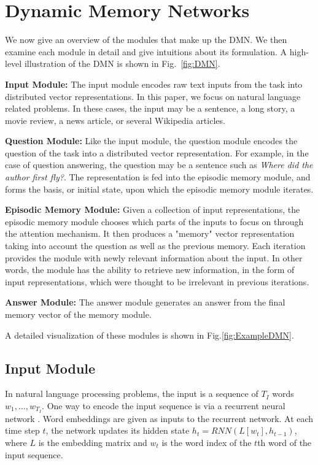 \documentclass{article}
\begin{document}
\section{Dynamic Memory Networks}
We now give an overview of the modules that make up the DMN. We then examine each module in detail and give intuitions about its formulation. A high-level illustration of the DMN is shown in Fig.~\ref{fig:DMN}.

\textbf{Input Module:}
The input module encodes raw text inputs from the task into distributed vector representations. In this paper, we focus on natural language related problems. In these cases, the input may be a sentence, a long story, a movie review, a news article, or several Wikipedia articles.

\textbf{Question Module:}
Like the input module, the question module encodes the question of the task into a distributed vector representation. For example, in the case of question answering, the question may be a sentence such as \emph{Where did the author first fly?}. The representation is fed into the episodic memory module, and forms the basis, or initial state, upon which the episodic memory module iterates.

\textbf{Episodic Memory Module:}
Given a collection of input representations, the episodic memory module chooses which parts of the inputs to focus on through the attention mechanism. It then produces a "memory" vector representation taking into account the question as well as the previous memory. Each iteration provides the module with newly relevant information about the input. In other words, the module has the ability to retrieve new information, in the form of input representations, which were thought to be irrelevant in previous iterations.

\textbf{Answer Module:} The answer module generates an answer from the final memory vector of the memory module.

A detailed visualization of these modules is shown in Fig.\ref{fig:ExampleDMN}.

\subsection{Input Module}\label{section:input}
In natural language processing problems, the input is a sequence of $T_I$ words $w_1,\ldots,w_{T_I}$. One way to encode the input sequence is via a recurrent neural network \cite{Elman1991}. Word embeddings are given as inputs to the recurrent network. At each time step $t$, the network updates its hidden state $h_t = RNN(L[w_t],h_{t-1})$, where $L$ is the embedding matrix and $w_t$ is the word index of the $t$th word of the input sequence.
\end{document}

